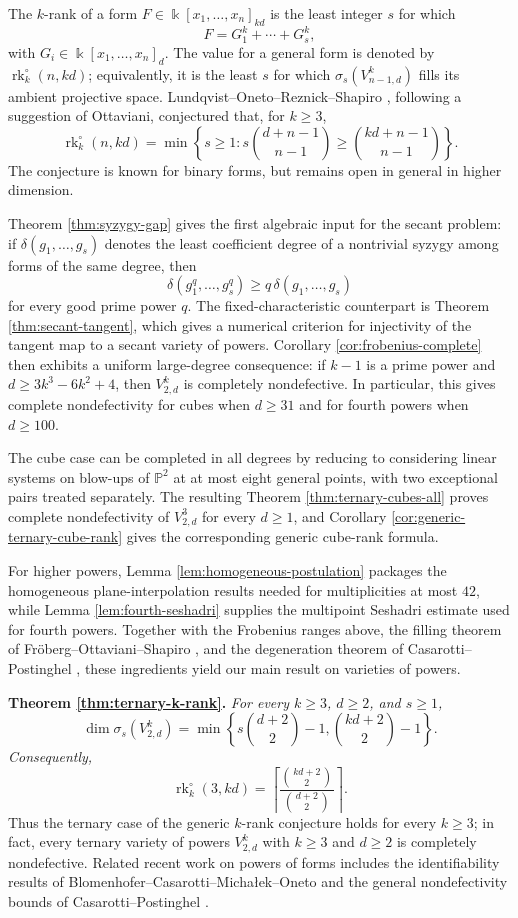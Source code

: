 \documentclass[11pt]{amsart}
\theoremstyle{remark}
\newcommand{\PP}{\mathbb P}
\newcommand{\kk}{\Bbbk}
\begin{document}
The $k$-rank of a form $F\in\kk[x_1,\ldots,x_n]_{kd}$ is the least integer $s$ for which
$$
F=G_1^k+\cdots+G_s^k,
$$
with $G_i\in\kk[x_1,\ldots,x_n]_d$. The value for a general form is denoted by $\operatorname{rk}^{\circ}_k(n,kd)$; equivalently, it is the least $s$ for which $\sigma_s(V^k_{n-1,d})$ fills its ambient projective space. Lundqvist--Oneto--Reznick--Shapiro \cite[Conjecture~1.2]{LORS}, following a suggestion of Ottaviani, conjectured that, for $k\ge3$,
$$
\operatorname{rk}^{\circ}_k(n,kd)
=
\min\left\{s\ge1:
 s\binom{d+n-1}{n-1}\ge \binom{kd+n-1}{n-1}\right\}.
$$
The conjecture is known for binary forms, but remains open in general in higher dimension.

Theorem \ref{thm:syzygy-gap} gives the first algebraic input for the secant problem: if $\delta(g_1,\ldots,g_s)$ denotes the least coefficient degree of a nontrivial syzygy among forms of the same degree, then
$$
\delta(g_1^q,\ldots,g_s^q)
\ge q\,\delta(g_1,\ldots,g_s)
$$
for every good prime power $q$. The fixed-characteristic counterpart is Theorem \ref{thm:secant-tangent}, which gives a numerical criterion for injectivity of the tangent map to a secant variety of powers. Corollary \ref{cor:frobenius-complete} then exhibits a uniform large-degree consequence: if $k-1$ is a prime power and $d\ge3k^3-6k^2+4$, then $V^k_{2,d}$ is completely nondefective. In particular, this gives complete nondefectivity for cubes when $d\ge31$ and for fourth powers when $d\ge100$.

The cube case can be completed in all degrees by reducing to considering linear systems on blow-ups of $\PP^2$ at at most eight general points, with two exceptional pairs treated separately. The resulting Theorem \ref{thm:ternary-cubes-all} proves complete nondefectivity of $V^3_{2,d}$ for every $d\ge1$, and Corollary \ref{cor:generic-ternary-cube-rank} gives the corresponding generic cube-rank formula.

For higher powers, Lemma \ref{lem:homogeneous-postulation} packages the homogeneous plane-interpolation results needed for multiplicities at most $42$, while Lemma \ref{lem:fourth-seshadri} supplies the multipoint Seshadri estimate used for fourth powers. Together with the Frobenius ranges above, the filling theorem of Fr\"oberg--Ottaviani--Shapiro \cite{FOS}, and the degeneration theorem of Casarotti--Postinghel \cite{CasarottiPostinghel}, these ingredients yield our main result on varieties of powers.

\medskip
\noindent\textbf{Theorem \ref{thm:ternary-k-rank}.}
\emph{For every $k\ge3$, $d\ge2$, and $s\ge1$,
$$
\dim\sigma_s(V^k_{2,d})
=
\min\left\{
 s\binom{d+2}{2}-1,
 \binom{kd+2}{2}-1
\right\}.
$$
Consequently,
$$
\operatorname{rk}^{\circ}_k(3,kd)
=
\left\lceil
\frac{\binom{kd+2}{2}}{\binom{d+2}{2}}
\right\rceil.
$$}
Thus the ternary case of the generic $k$-rank conjecture holds for every $k\ge3$; in fact, every ternary variety of powers $V^k_{2,d}$ with $k\ge3$ and $d\ge2$ is completely nondefective. Related recent work on powers of forms includes the identifiability results of Blomenhofer--Casarotti--Micha{\l}ek--Oneto \cite{BCMO} and the general nondefectivity bounds of Casarotti--Postinghel \cite{CasarottiPostinghel}.
\end{document}
